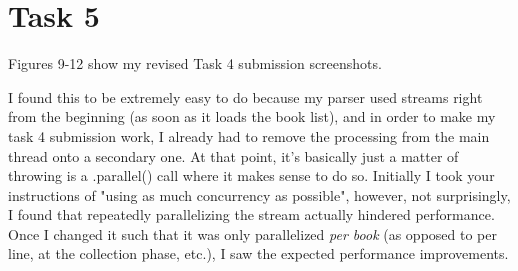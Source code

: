 \documentclass[11pt]{article}
\begin{document}
	\section{Task 5}
	Figures 9-12 show my revised Task 4 submission screenshots. 
	
	I found this to be extremely easy to do because my parser used streams right from the beginning (as soon as it loads the book list), and in order to make my task 4 submission work, I already had to remove the processing from the main thread onto a secondary one. At that point, it's basically just a matter of throwing is a .parallel() call where it makes sense to do so. Initially I took your instructions of "using as much concurrency as possible", however, not surprisingly, I found that repeatedly parallelizing the stream actually hindered performance. Once I changed it such that it was only parallelized \textit{per book} (as opposed to per line, at the collection phase, etc.), I saw the expected performance improvements.
	
\end{document}
